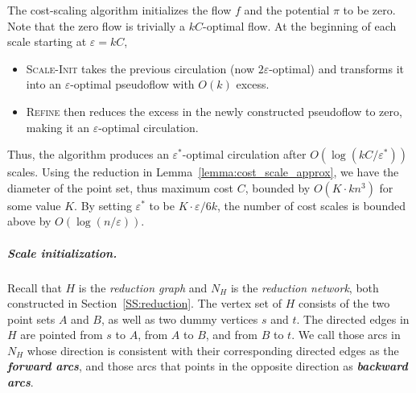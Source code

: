 \documentclass[a4paper,UKenglish]{socg-lipics-v2018}
\def\eps{\varepsilon}
\def\supp{\operatorname{supp}}
\theoremstyle{plain}
\numberwithin{figure}{section}
\renewcommand{\paragraph}{\subparagraph}
\def\EMPH#1{\textbf{\emph{\boldmath #1}}}
\begin{document}
The cost-scaling algorithm initializes the flow $f$ and the potential $\pi$ to be zero.
Note that the zero flow is trivially a $kC$-optimal flow.
At the beginning of each scale starting at $\eps = kC$,
\begin{itemize}
\item
\textsc{Scale-Init} takes the previous
circulation (now $2\eps$-optimal) and transforms it into an $\eps$-optimal
pseudoflow with $O(k)$ excess.
\item
\textsc{Refine} then reduces the excess in the newly constructed pseudoflow to zero, making it an $\eps$-optimal
circulation.
\end{itemize}
Thus, the algorithm produces an $\eps^*$-optimal circulation after
$O(\log(kC/\eps^*))$ scales.
%
Using the reduction in Lemma~\ref{lemma:cost_scale_approx}, we have the diameter of the point set, thus maximum cost $C$, bounded by $O(K \cdot kn^3)$ for some value $K$.  By setting $\eps^*$ to be $K \cdot \eps/6k$, the number of cost scales is bounded above by $O(\log(n/\eps))$.


\paragraph{Scale initialization.}


Recall that $H$ is the \emph{reduction graph} and $N_H$ is the \emph{reduction network}, both constructed in Section~\ref{SS:reduction}.  The vertex set of $H$ consists of the two point sets $A$ and $B$, as well as two dummy vertices $s$ and $t$.  The directed edges in $H$ are pointed from $s$ to $A$, from $A$ to $B$, and from $B$ to $t$.  We call those arcs in $N_H$ whose direction is consistent with their corresponding directed edges as the \EMPH{forward arcs}, and those arcs that points in the opposite direction as \EMPH{backward arcs}.
\end{document}

